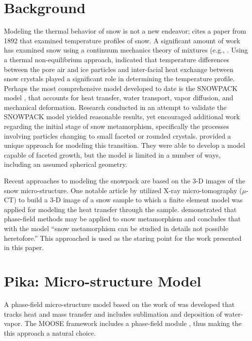 \section{Background}\label{sec:background}
Modeling the thermal behavior of snow is not a new endeavor; \citet{lachapelle1960critique} cites a paper from 1892 that examined temperature profiles of snow. A significant amount of work has examined snow using a continuum mechanics theory of mixtures (e.g., \citet{adams1989constitutive, brown1999mixture}.  Using a thermal non-equilibrium approach, \citet{bartelt2004} indicated that temperature differences between the pore air and ice particles and inter-facial heat exchange between snow crystals played a significant role in determining the temperature profile. Perhaps the most comprehensive model developed to date is the SNOWPACK model \citep{bartelt2002physical, lehning2002physical, lehning2002physicalb}, that accounts for heat transfer, water transport, vapor diffusion, and mechanical deformation.  Research conducted in an attempt to validate the SNOWPACK model yielded reasonable results, yet \citet{fierz2001assessment} encouraged additional work regarding the initial stage of snow metamorphism, specifically the processes involving particles changing to small faceted or rounded crystals. \citet{miller2009microstructural} provided a unique approach for modeling this transition. They were able to develop a model capable of faceted growth, but the model is limited in a number of ways, including an assumed spherical geometry.

Recent approaches to modeling the snowpack are based on the 3-D images of the snow micro-structure.  One notable article by \citet{kaempfer2005microstructural} utilized X-ray micro-tomography ($\mu$-CT) to build a 3-D image of a snow sample to which a finite element model was applied for modeling the heat transfer through the sample. \citet{kaempfer2009phase} demonstrated that phase-field methods may be applied to snow metamorphism and concludes that with the model ``snow metamorphism can be studied in details not possible heretofore.'' This approached is used as the staring point for the work presented in this paper.

\section{Pika: Micro-structure Model}\label{sec:pika}
A phase-field micro-structure model based on the work of \citet{kaempfer2009phase} was developed that tracks heat and mass transfer and includes sublimation and deposition of water-vapor. The MOOSE framework includes a phase-field module \citep{tonks2012object}, thus making the this approach a natural choice.

